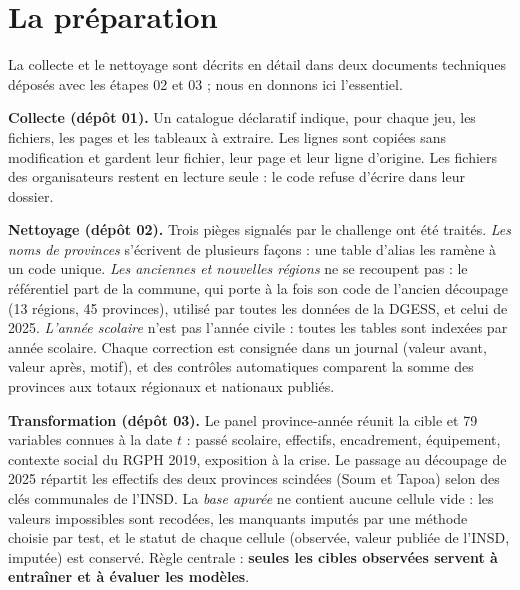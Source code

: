 \documentclass{article}
\begin{document}
\section{La préparation}

La collecte et le nettoyage sont décrits en détail dans deux documents techniques déposés avec les étapes 02 et 03 ; nous en donnons ici l'essentiel.

\textbf{Collecte (dépôt 01).} Un catalogue déclaratif indique, pour chaque jeu, les fichiers, les pages et les tableaux à extraire. Les lignes sont copiées sans modification et gardent leur fichier, leur page et leur ligne d'origine. Les fichiers des organisateurs restent en lecture seule : le code refuse d'écrire dans leur dossier.

\textbf{Nettoyage (dépôt 02).} Trois pièges signalés par le challenge ont été traités. \emph{Les noms de provinces} s'écrivent de plusieurs façons : une table d'alias les ramène à un code unique. \emph{Les anciennes et nouvelles régions} ne se recoupent pas : le référentiel part de la commune, qui porte à la fois son code de l'ancien découpage (13 régions, 45 provinces), utilisé par toutes les données de la DGESS, et celui de 2025. \emph{L'année scolaire} n'est pas l'année civile : toutes les tables sont indexées par année scolaire. Chaque correction est consignée dans un journal (valeur avant, valeur après, motif), et des contrôles automatiques comparent la somme des provinces aux totaux régionaux et nationaux publiés.

\textbf{Transformation (dépôt 03).} Le panel province-année réunit la cible et 79 variables connues à la date $t$ : passé scolaire, effectifs, encadrement, équipement, contexte social du RGPH 2019, exposition à la crise. Le passage au découpage de 2025 répartit les effectifs des deux provinces scindées (Soum et Tapoa) selon des clés communales de l'INSD. La \emph{base apurée} ne contient aucune cellule vide : les valeurs impossibles sont recodées, les manquants imputés par une méthode choisie par test, et le statut de chaque cellule (observée, valeur publiée de l'INSD, imputée) est conservé. Règle centrale : \textbf{seules les cibles observées servent à entraîner et à évaluer les modèles}.
\end{document}
